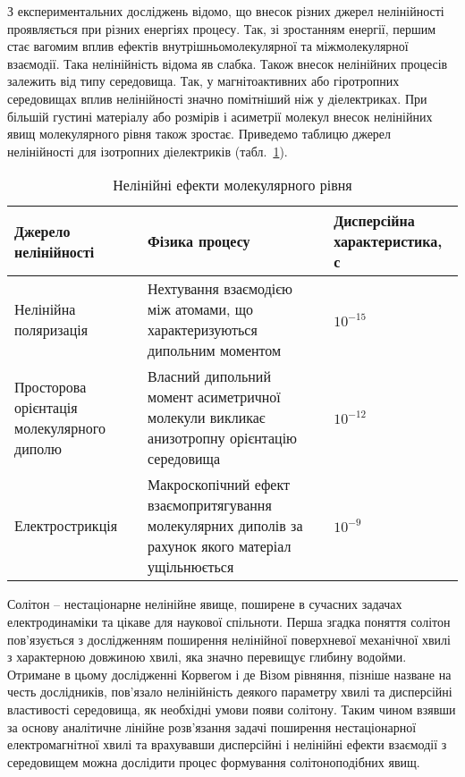 З експериментальних досліджень відомо, що внесок різних джерел нелінійності 
проявляється при різних енергіях процесу. Так, зі зростанням енергії, першим 
стає вагомим вплив ефектів внутрішньомолекулярної та міжмолекулярної 
взаємодії. Така нелінійність відома яв слабка. Також внесок нелінійних процесів
залежить від типу середовища. Так, у магнітоактивних або гіротропних 
середовищах вплив нелінійності значно помітніший ніж у діелектриках. 
При більшій густині матеріалу або розмірів і асиметрії молекул внесок нелінійних 
явищ молекулярного рівня також зростає. Приведемо таблицю джерел нелінійності 
для ізотропних діелектриків (табл.~\ref{tab:molecular_nonlinear}).
 

\begin{table}
\caption{Нелінійні ефекти молекулярного рівня} 
\label{tab:molecular_nonlinear}
\centering
\begin{tabular}{ |p{4.2cm}|p{5.6cm}|p{4.6cm}| } 
	
	\hline
	Джерело нелінійності & Фізика процесу & Дисперсійна характеристика, с  \\ 
	
	\hline
	Нелінійна поляризація & 
	Нехтування взаємодією між атомами, що характеризуються дипольним моментом & 
	$ 10^{-15} $  \\  
	
	\hline
	Просторова орієнтація молекулярного диполю & 
	Власний дипольний момент асиметричної молекули викликає анизотропну 
	орієнтацію середовища & 
	$ 10^{-12} $  \\  
	
	\hline
	Електрострикція & 
	Макроскопічний ефект взаємопритягування молекулярних диполів за рахунок 
	якого матеріал ущільнюється  & 
	$ 10^{-9} $  \\  
	
	\hline
\end{tabular}
\end{table}

Солітон -- нестаціонарне нелінійне явище, поширене в сучасних 
задачах електродинаміки та цікаве для наукової спільноти. Перша згадка 
поняття солітон пов'язується з дослідженням поширення нелінійної поверхневої 
механічної хвилі з характерною довжиною хвилі, яка значно перевищує глибину 
водойми. Отримане в цьому дослідженні Корвегом і де Візом рівняння, пізніше 
назване на честь дослідників, пов'язало нелінійність деякого параметру хвилі 
та дисперсійні властивості середовища, як необхідні умови появи солітону.
Таким чином взявши за основу аналітичне лінійне розв'язання задачі поширення 
нестаціонарної електромагнітної хвилі та врахувавши дисперсійні і нелінійні 
ефекти взаємодії з середовищем можна дослідити процес формування 
солітоноподібних явищ.

